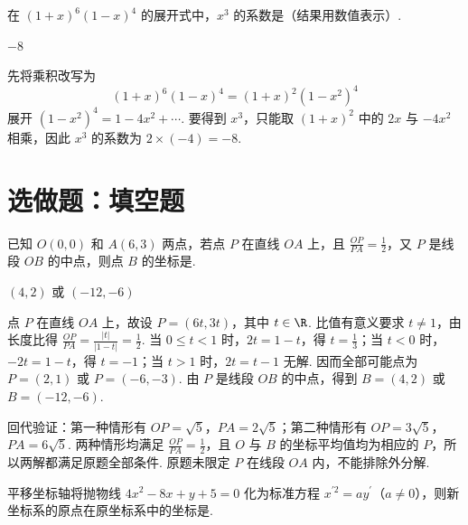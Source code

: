 \begin{problem}
在 \((1+x)^6(1-x)^4\) 的展开式中，\(x^3\) 的系数是（结果用数值表示）\fillinblank{}.
\end{problem}

\begin{answer}
\(-8\)
\end{answer}

\begin{solution}
先将乘积改写为
\[
(1+x)^6(1-x)^4=(1+x)^2(1-x^2)^4
\]
展开 \((1-x^2)^4=1-4x^2+\cdots\). 要得到 \(x^3\)，只能取 \((1+x)^2\) 中的 \(2x\) 与 \(-4x^2\) 相乘，因此 \(x^3\) 的系数为 \(2\times(-4)=-8\).
\end{solution}

\section{选做题：填空题}

\begin{problem}[A]
已知 \(O(0,0)\) 和 \(A(6,3)\) 两点，若点 \(P\) 在直线 \(OA\) 上，且 \(\frac{OP}{PA}=\frac{1}{2}\)，又 \(P\) 是线段 \(OB\) 的中点，则点 \(B\) 的坐标是\fillinblank{}.
\end{problem}

\begin{answer}
\((4,2)\) 或 \((-12,-6)\)
\end{answer}

\begin{solution}
点 \(P\) 在直线 \(OA\) 上，故设 \(P=(6t,3t)\)，其中 \(t\in\R\). 比值有意义要求 \(t\neq1\)，由长度比得 \(\frac{OP}{PA}=\frac{|t|}{|1-t|}=\frac{1}{2}\). 当 \(0\leqslant t<1\) 时，\(2t=1-t\)，得 \(t=\frac{1}{3}\)；当 \(t<0\) 时，\(-2t=1-t\)，得 \(t=-1\)；当 \(t>1\) 时，\(2t=t-1\) 无解. 因而全部可能点为 \(P=(2,1)\) 或 \(P=(-6,-3)\). 由 \(P\) 是线段 \(OB\) 的中点，得到 \(B=(4,2)\) 或 \(B=(-12,-6)\).

回代验证：第一种情形有 \(OP=\sqrt5\)，\(PA=2\sqrt5\)；第二种情形有 \(OP=3\sqrt5\)，\(PA=6\sqrt5\). 两种情形均满足 \(\frac{OP}{PA}=\frac{1}{2}\)，且 \(O\) 与 \(B\) 的坐标平均值均为相应的 \(P\)，所以两解都满足原题全部条件. 原题未限定 \(P\) 在线段 \(OA\) 内，不能排除外分解.
\end{solution}

\begin{problem}[A]
平移坐标轴将抛物线 \(4x^{2}-8x+y+5=0\) 化为标准方程 \(x^{\prime2}=ay^{\prime}\)（\(a\neq0\)），则新坐标系的原点在原坐标系中的坐标是\fillinblank{}.
\end{problem}

